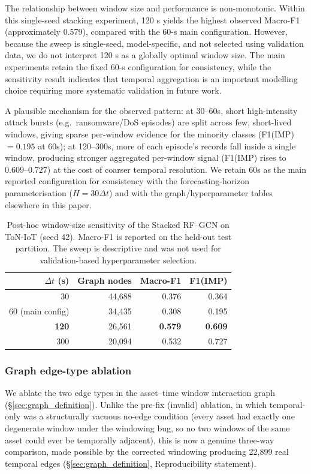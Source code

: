 \documentclass[pdflatex,sn-mathphys-num]{sn-jnl}
\theoremstyle{thmstyleone}%
\theoremstyle{thmstyletwo}%
\theoremstyle{thmstylethree}%
\begin{document}
The relationship between window size and performance is non-monotonic. Within this single-seed stacking experiment, 120 s yields the highest observed Macro-F1 (approximately 0.579), compared with the 60-s main configuration. However, because the sweep is single-seed, model-specific, and not selected using validation data, we do not interpret 120 s as a globally optimal window size. The main experiments retain the fixed 60-s configuration for consistency, while the sensitivity result indicates that temporal aggregation is an important modelling choice requiring more systematic validation in future work.

A plausible mechanism for the observed pattern: at 30--60s, short high-intensity attack bursts (e.g.\ ransomware/DoS episodes) are split across few, short-lived windows, giving sparse per-window evidence for the minority classes (F1(IMP)$=0.195$ at 60s); at 120--300s, more of each episode's records fall inside a single window, producing stronger aggregated per-window signal (F1(IMP) rises to $0.609$--$0.727$) at the cost of coarser temporal resolution. We retain 60s as the main reported configuration for consistency with the forecasting-horizon parameterisation ($H=30\Delta t$) and with the graph/hyperparameter tables elsewhere in this paper.

\begin{table}[!t]
\centering
\caption{Post-hoc window-size sensitivity of the Stacked RF--GCN on ToN-IoT (seed 42). Macro-F1 is reported on the held-out test partition. The sweep is descriptive and was not used for validation-based hyperparameter selection.}
\label{tab:toniot_window_sensitivity_corrected}
\begin{tabular}{rrrr}
\toprule
\textbf{$\Delta t$ (s)} & \textbf{Graph nodes} & \textbf{Macro-F1} & \textbf{F1(IMP)} \\
\midrule
30  & 44{,}688 & 0.376 & 0.364 \\
60 (main config)  & 34{,}435 & 0.308 & 0.195 \\
\textbf{120} & 26{,}561 & \textbf{0.579} & \textbf{0.609} \\
300 & 20{,}094 & 0.532 & 0.727 \\
\bottomrule
\end{tabular}
\end{table}

\subsubsection{Graph edge-type ablation}
\label{subsec:graph_ablation_corrected}
We ablate the two edge types in the asset--time window interaction graph (\S\ref{sec:graph_definition}). Unlike the pre-fix (invalid) ablation, in which temporal-only was a structurally vacuous no-edge condition (every asset had exactly one degenerate window under the windowing bug, so no two windows of the same asset could ever be temporally adjacent), this is now a genuine three-way comparison, made possible by the corrected windowing producing 22,899 real temporal edges (\S\ref{sec:graph_definition}, Reproducibility statement).
\end{document}
